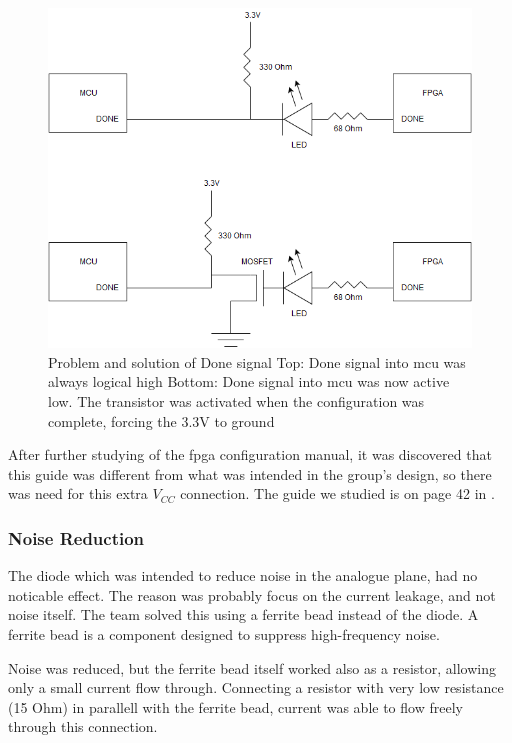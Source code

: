 \begin{figure}[h!]
\centering
\includegraphics[scale=0.5]{images/Done_Signal_Issue.png}
\caption{Problem and solution of Done signal
         \newline
         Top: Done signal into \gls{mcu} was always logical high
         \newline
         Bottom: Done signal into \gls{mcu} was now active low. The transistor was activated when the configuration was complete, forcing the 3.3V to ground}
\label{fig:Done Issue}
\end{figure}

After further studying of the \gls{fpga} configuration manual, it was discovered that this guide was different from what was intended in the group's design, so there was need for this extra \(V_{CC}\) connection. The guide we studied is on page 42 in \cite{fpga-configuration}.

\subsubsection{Noise Reduction}
The diode which was intended to reduce noise in the analogue plane, had no noticable effect. 
The reason was probably focus on the current leakage, and not noise itself. 
The team solved this using a ferrite bead instead of the diode. 
A ferrite bead is a component designed to suppress high-frequency noise. 

Noise was reduced, but the ferrite bead itself worked also as a resistor, allowing only a small current flow through. 
Connecting a resistor with very low resistance (15 Ohm) in parallell with the ferrite bead, current was able to flow freely through this connection.

